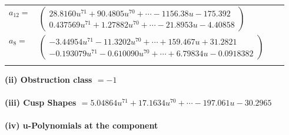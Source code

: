 \documentclass[1p]{elsarticle_modified}
\theoremstyle{definition}
\begin{document}
\begin{tabular}{m{7pt} m{180pt} m{7pt} m{180pt} }
\flushright $a_{12}=$&$\begin{pmatrix}28.8160 u^{71}+90.4805 u^{70}+\cdots-1156.38 u-175.392\\0.437569 u^{71}+1.27882 u^{70}+\cdots-21.8953 u-4.40858\end{pmatrix}$ \\
\flushright $a_{8}=$&$\begin{pmatrix}-3.44954 u^{71}-11.3202 u^{70}+\cdots+159.467 u+31.2821\\-0.193079 u^{71}-0.610090 u^{70}+\cdots+6.79834 u-0.0918382\end{pmatrix}$\\&\end{tabular}
\flushleft \textbf{(ii) Obstruction class $= -1$}\\~\\
\flushleft \textbf{(iii) Cusp Shapes $= 5.04864 u^{71}+17.1634 u^{70}+\cdots-197.061 u-30.2965$}\\~\\
\newpage\renewcommand{\arraystretch}{1}
\flushleft \textbf{(iv) u-Polynomials at the component}\newline \\
\end{document}
